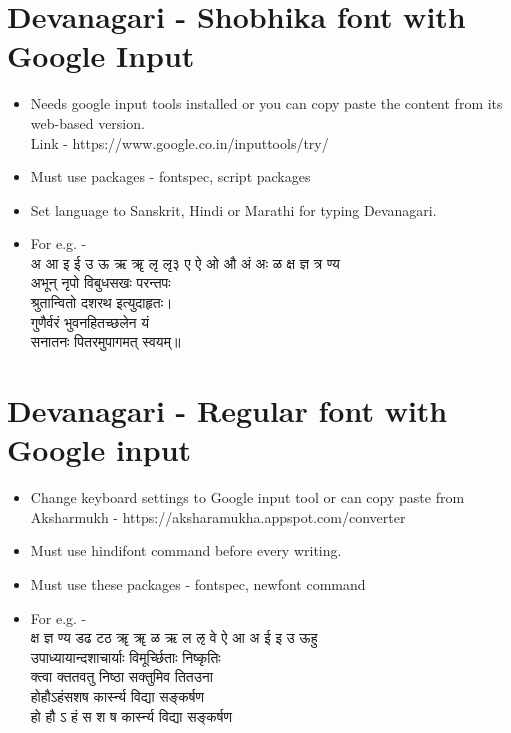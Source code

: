 \documentclass{article}
\begin{document}
\section{Devanagari - Shobhika font with Google Input}
\begin{Large}
    \begin{itemize}
    \item Needs google input tools installed or you can copy paste the content from its web-based version.\\
    Link - https://www.google.co.in/inputtools/try/
    \item Must use packages - fontspec, script packages
    \item Set language to Sanskrit, Hindi or Marathi for typing Devanagari.
    \item For e.g. -\\
{\scriptsize {\s अ आ इ ई उ ऊ ऋ ॠ लृ लृ३ ए ऐ ओ औ अं अः ळ क्ष ज्ञ त्र ण्य}}\\
{\small {\s अभून् नृपो विबुधसखः परन्तपः}}\\
{\large {\s श्रुतान्वितो दशरथ इत्युदाहृतः।}}\\
{\Large {\s गुणैर्वरं भुवनहितच्छलेन यं}}\\
{\huge {\s सनातनः पितरमुपागमत् स्वयम्॥}} 
\end{itemize}
\end{Large}
\pagebreak

\section{Devanagari - Regular font with Google input}
\begin{Large}
    \begin{itemize}
    \item Change keyboard settings to Google input tool or can copy paste from Aksharmukh - https://aksharamukha.appspot.com/converter

    \item Must use hindifont command before every writing. 
    
    \item Must use these packages - fontspec, newfont command
     \item For e.g. -\\
     {\hindifont
     {\scriptsize क्ष ज्ञ ण्य डढ टठ ॠ ॠ ळ ऋ ल ऌ वे ऐ आ अ ई इ उ ऊहु}\\
     {\small उपाध्यायान्दशाचार्याः विमूर्च्छिताः निष्कृतिः}\\
     {\large क्त्वा क्ततवतु निष्ठा सक्तुमिव तितउना}\\
     {\Large होहौऽहंसशष कार्स्न्य विद्या सङ्कर्षण}\\
     {\huge हो हौ ऽ हं स श ष कार्स्न्य विद्या सङ्कर्षण}
     }
    \end{itemize}
\end{Large}
\pagebreak
\end{document}
